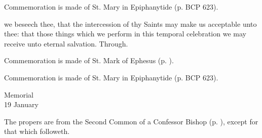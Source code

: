 \begin{rubric}
    Commemoration is made of St. Mary in Epiphanytide (p. BCP 623).
\end{rubric}


\postcommunion
{} we beseech thee, that the intercession of thy Saints may make us acceptable unto thee: that those things which we perform in this temporal celebration we may receive unto eternal salvation. Through.

\begin{rubric}
    Commemoration is made of St. Mark of Ephesus (p. \pageref{EphesianPostcommunion}).
\end{rubric}

\begin{rubric}
    Commemoration is made of St. Mary in Epiphanytide (p. BCP 623).
\end{rubric}

\begin{inhead}
    {Memorial\\
19 January}
\end{inhead}

\begin{rubric}
	The propers are from the Second Common of a Confessor Bishop (p. \pageref{CommonConfessorBishopII}), except for that which followeth.
\end{rubric}













